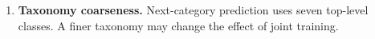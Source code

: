 \begin{enumerate}
    \item \textbf{Taxonomy coarseness.} Next-category prediction uses seven top-level
    classes. A finer taxonomy may change the effect of joint training.

\end{enumerate}
